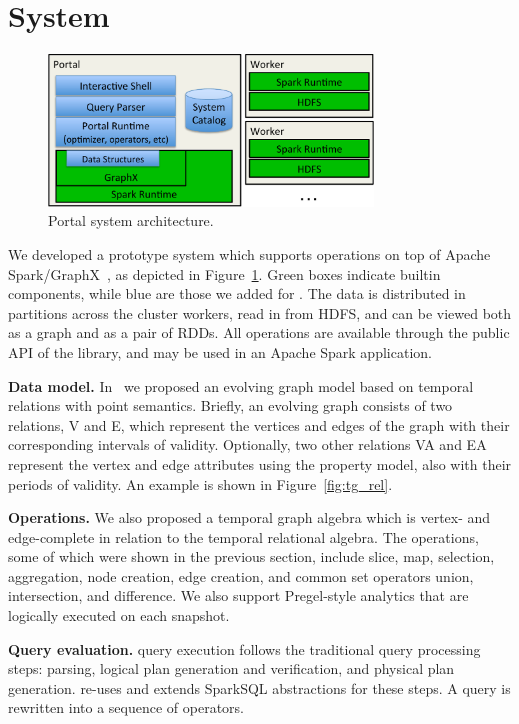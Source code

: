 \section{System}
\label{sec:sys}

\begin{figure}[t]
\centering
\includegraphics[width=3.4in]{figs/architecture.pdf}
\caption{Portal system architecture.}
\label{fig:arch}
\end{figure}

We developed a prototype system \ql which supports \tga operations on
top of Apache Spark/GraphX~\cite{DBLP:conf/osdi/GonzalezXDCFS14}, as
depicted in Figure~\ref{fig:arch}.  Green boxes indicate builtin
components, while blue are those we added for \ql.  The data is
distributed in partitions across the cluster workers, read in from
HDFS, and can be viewed both as a graph and as a pair of RDDs.  All
\tg operations are available through the public API of the \ql
library, and may be used in an Apache Spark application.

{\bf Data model.}  In~\cite{PortalarXiv2016} we proposed an evolving
graph model \tg based on temporal relations with point semantics.
Briefly, an evolving graph consists of two relations, V and E, which
represent the vertices and edges of the graph with their corresponding
intervals of validity.  Optionally, two other relations VA and EA
represent the vertex and edge attributes using the property model,
also with their periods of validity.  An example is shown in
Figure~\ref{fig:tg_rel}.

{\bf Operations.}  We also proposed a temporal graph algebra \tga
which is vertex- and edge-complete in relation to the temporal
relational algebra.  The \tga operations, some of which were shown in
the previous section, include slice, map, selection, aggregation, node
creation, edge creation, and common set operators union, intersection,
and difference.  We also support Pregel-style analytics that are
logically executed on each snapshot.

{\bf Query evaluation.}  \ql query execution follows the traditional
query processing steps: parsing, logical plan generation and
verification, and physical plan generation. \ql re-uses and extends
SparkSQL abstractions for these steps.  A \ql query is rewritten into
a sequence of operators.

